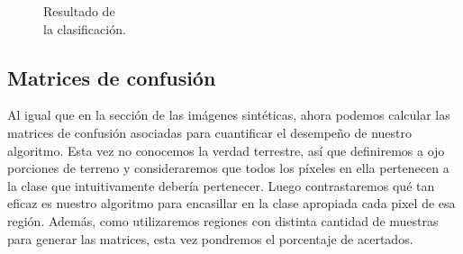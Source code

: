 \begin{figure}[H]
\begin{minipage}{0.49\textwidth}
     \caption{Resultado de  \\ la clasificación. \\}
   \end{minipage}
\end{figure}

\subsection{Matrices de confusión}
Al igual que en la sección de las imágenes sintéticas, ahora podemos calcular las matrices de confusión asociadas para cuantificar el desempeño de nuestro algoritmo. Esta vez no conocemos la verdad terrestre, así que definiremos a ojo porciones de terreno y consideraremos que todos los píxeles en ella pertenecen a la clase que intuitivamente debería pertenecer. Luego contrastaremos qué tan eficaz es nuestro algoritmo para encasillar en la clase apropiada cada pixel de esa región. Además, como utilizaremos regiones con distinta cantidad de muestras para generar las matrices, esta vez pondremos el porcentaje de acertados.

